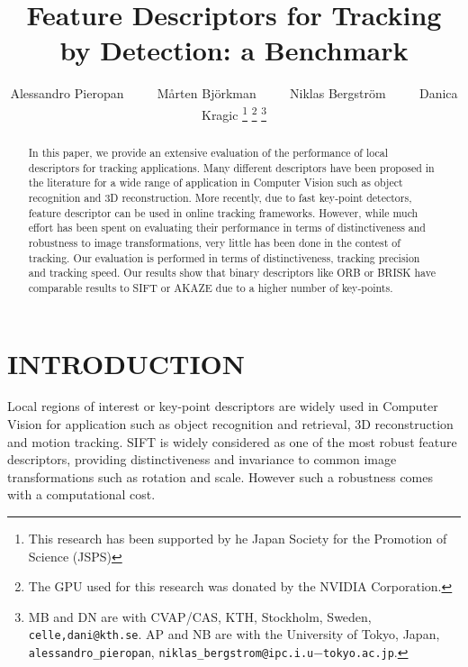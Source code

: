 \documentclass[letterpaper, 10pt, conference]{ieeeconf}
\title{\LARGE \bf Feature Descriptors for Tracking by Detection: a Benchmark}
\author{Alessandro Pieropan ~~~~ Mårten Bj{\"o}rkman  ~~~~ Niklas Bergstr{\"o}m ~~~~ Danica Kragic%
\thanks{This research has been supported by he Japan Society for the Promotion of Science (JSPS)}
\thanks{The GPU used for this research was donated by the NVIDIA Corporation.}
\thanks{MB and DN are with CVAP/CAS, KTH, Stockholm, Sweden, {\tt celle,dani@kth.se}. AP and NB are with the University of Tokyo, Japan, {\tt alessandro\_pieropan}, {\tt niklas\_bergstrom@ipc.i.u$-$tokyo.ac.jp}.}}
\begin{document}
                                                                
                                                                                
\maketitle                                                                      
\thispagestyle{empty}                                                           
\pagestyle{empty}



\begin{abstract}
In this paper, we provide an extensive evaluation of the performance of local descriptors for tracking applications.
Many different descriptors have been proposed in the literature for a wide range of application in Computer Vision such as object recognition and 3D reconstruction. More recently, due to fast key-point detectors, feature descriptor can be used in online tracking frameworks. However, while much effort has been spent on evaluating their performance in terms of distinctiveness and robustness to image transformations, very little has been done in the contest of tracking. Our evaluation is performed in terms of distinctiveness, tracking precision and tracking speed. Our results show that binary descriptors like ORB or BRISK have comparable results to SIFT or AKAZE due to a higher number of key-points.    

\end{abstract}

\section{INTRODUCTION}
\label{sec:introduction}



Local regions of interest or key-point descriptors are widely used in Computer Vision for application such as object recognition and retrieval, 3D reconstruction and motion tracking. SIFT \cite{lowe04} is widely considered as one of the most robust feature descriptors, providing distinctiveness and invariance to common image transformations such as rotation and scale. However such a robustness comes with a computational cost. 
\end{document}
